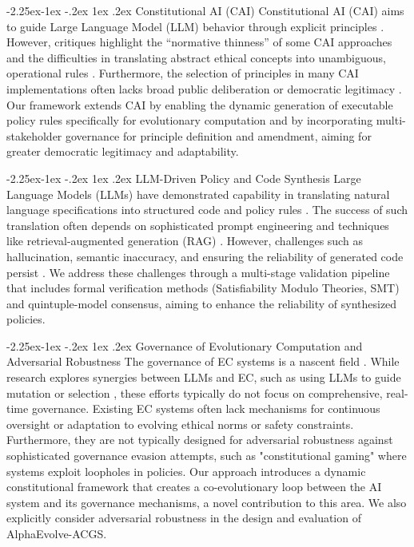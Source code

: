 \documentclass[manuscript,screen,9pt]{acmart}
\makeatletter
\renewcommand\subsection{\@startsection{subsection}{2}{\z@}%
  {-2.25ex\@plus -1ex \@minus -.2ex}%
  {1ex \@plus .2ex}%
  {\normalfont\large\bfseries}}
\makeatother
\begin{document}
\subsection{Constitutional AI (CAI)}
Constitutional AI (CAI) aims to guide Large Language Model (LLM) behavior through explicit principles \cite{Bai2025ConstitutionalAI}. However, critiques highlight the ``normative thinness'' of some CAI approaches and the difficulties in translating abstract ethical concepts into unambiguous, operational rules \cite{DigiCon2025ConstitutionalAIThin, ChaconMenke2025CAISmallLLMs}. Furthermore, the selection of principles in many CAI implementations often lacks broad public deliberation or democratic legitimacy \cite{Hwang2025PublicCAI}. Our framework extends CAI by enabling the dynamic generation of executable policy rules specifically for evolutionary computation and by incorporating multi-stakeholder governance for principle definition and amendment, aiming for greater democratic legitimacy and adaptability.

\subsection{LLM-Driven Policy and Code Synthesis}
\label{subsec:related_llm_synthesis}
Large Language Models (LLMs) have demonstrated capability in translating natural language specifications into structured code and policy rules \cite{Almulla2024EmergenceLLMPolicy, ResearchGate2025AutoPAC, Li2025VeriCoder}. The success of such translation often depends on sophisticated prompt engineering and techniques like retrieval-augmented generation (RAG) \cite{AnalyticsVidhya2024PromptingTechniques, arXiv2025FutureWorkRAG}. However, challenges such as hallucination, semantic inaccuracy, and ensuring the reliability of generated code persist \cite{AAAI2025CodeHalu, Taeihagh2025Governing}. We address these challenges through a multi-stage validation pipeline that includes formal verification methods (Satisfiability Modulo Theories, SMT) and quintuple-model consensus, aiming to enhance the reliability of synthesized policies.

\subsection{Governance of Evolutionary Computation and Adversarial Robustness}
\label{subsec:related_ec_governance}
The governance of EC systems is a nascent field \cite{Chauhan2025ECLLMSurvey}. While research explores synergies between LLMs and EC, such as using LLMs to guide mutation or selection \cite{Nordin2024LLMGP}, these efforts typically do not focus on comprehensive, real-time governance. Existing EC systems often lack mechanisms for continuous oversight or adaptation to evolving ethical norms or safety constraints. Furthermore, they are not typically designed for adversarial robustness against sophisticated governance evasion attempts, such as "constitutional gaming" where systems exploit loopholes in policies. Our approach introduces a dynamic constitutional framework that creates a co-evolutionary loop between the AI system and its governance mechanisms, a novel contribution to this area. We also explicitly consider adversarial robustness in the design and evaluation of AlphaEvolve-ACGS.
\end{document}
